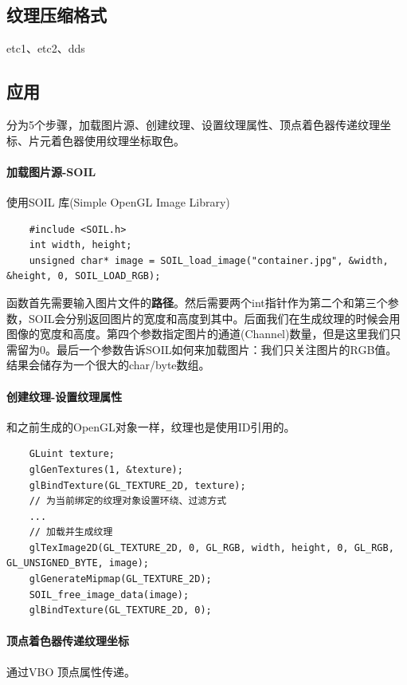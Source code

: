 \documentclass[UTF8,a4paper,12pt]{ctexbook}
\begin{document}
		\subsection{纹理压缩格式}
			etc1、etc2、dds
		
		
		\subsection{应用}
			分为5个步骤，加载图片源、创建纹理、设置纹理属性、顶点着色器传递纹理坐标、片元着色器使用纹理坐标取色。
			
			\paragraph{加载图片源-SOIL}
				使用SOIL 库(Simple OpenGL Image Library)
				
				\begin{lstlisting}
	#include <SOIL.h>
	int width, height;
	unsigned char* image = SOIL_load_image("container.jpg", &width, &height, 0, SOIL_LOAD_RGB);			
				\end{lstlisting}
				
				函数首先需要输入图片文件的\textbf{路径}。然后需要两个int指针作为第二个和第三个参数，SOIL会分别返回图片的宽度和高度到其中。后面我们在生成纹理的时候会用图像的宽度和高度。第四个参数指定图片的通道(Channel)数量，但是这里我们只需留为0。最后一个参数告诉SOIL如何来加载图片：我们只关注图片的RGB值。结果会储存为一个很大的char/byte数组。
			
			\paragraph{创建纹理-设置纹理属性}
				和之前生成的OpenGL对象一样，纹理也是使用ID引用的。
				
				\begin{lstlisting}
	GLuint texture;
	glGenTextures(1, &texture);		
	glBindTexture(GL_TEXTURE_2D, texture);	
	// 为当前绑定的纹理对象设置环绕、过滤方式
	...
	// 加载并生成纹理
	glTexImage2D(GL_TEXTURE_2D, 0, GL_RGB, width, height, 0, GL_RGB, GL_UNSIGNED_BYTE, image);
	glGenerateMipmap(GL_TEXTURE_2D);	
	SOIL_free_image_data(image);
	glBindTexture(GL_TEXTURE_2D, 0);
				\end{lstlisting}

			\paragraph{顶点着色器传递纹理坐标}
				
				通过VBO 顶点属性传递。
				
\end{document}
